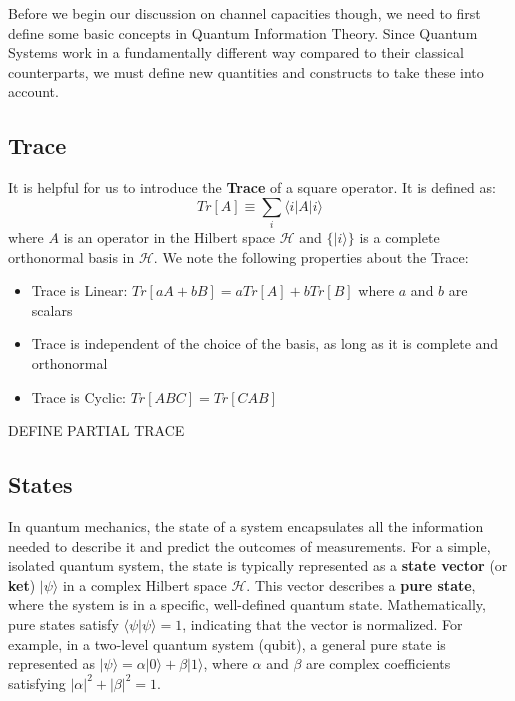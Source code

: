 Before we begin our discussion on channel capacities though, we need to first define some
basic concepts in Quantum Information Theory. Since Quantum Systems work in a fundamentally
different way compared to their classical counterparts, we must define new quantities and
constructs to take these into account.

\subsection{Trace}
It is helpful for us to introduce the \textbf{Trace} of a square operator. It is defined as:
\begin{equation}
    Tr[A] \equiv \displaystyle\sum_{i} \langle i | A | i \rangle
\end{equation}
where $A$ is an operator in the Hilbert space $\mathcal{H}$ and $\{|i\rangle\}$ is a complete
orthonormal basis in $\mathcal{H}$.
We note the following properties about the Trace:
\begin{itemize}
    \item Trace is Linear: $Tr[aA + bB] = aTr[A] + bTr[B]$ where $a$ and $b$ are scalars
    \item Trace is independent of the choice of the basis, as long as it is complete and orthonormal
    \item Trace is Cyclic: $Tr[ABC] = Tr[CAB]$
\end{itemize} 

DEFINE PARTIAL TRACE

\subsection{States}

In quantum mechanics, the state of a system encapsulates all the information needed to describe
it and predict the outcomes of measurements. For a simple, isolated quantum system, the state
is typically represented as a \textbf{state vector} (or \textbf{ket}) \( |\psi\rangle \) in a
complex Hilbert space \( \mathcal{H} \). This vector describes a \textbf{pure state}, where the
system is in a specific, well-defined quantum state. Mathematically, pure states satisfy
\( \langle \psi | \psi \rangle = 1 \), indicating that the vector is normalized. For example,
in a two-level quantum system (qubit), a general pure state is represented as
\( |\psi\rangle = \alpha |0\rangle + \beta |1\rangle \), where \( \alpha \) and \( \beta \) are
complex coefficients satisfying \( |\alpha|^2 + |\beta|^2 = 1 \).

